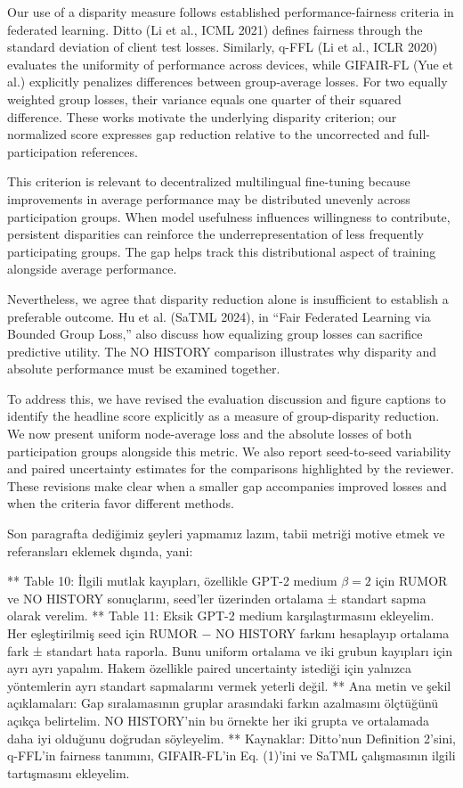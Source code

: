 Our use of a disparity measure follows established performance-fairness criteria in federated learning. Ditto (Li et al., ICML 2021) defines fairness through the standard deviation of client test losses. Similarly, q-FFL (Li et al., ICLR 2020) evaluates the uniformity of performance across devices, while GIFAIR-FL (Yue et al.) explicitly penalizes differences between group-average losses. For two equally weighted group losses, their variance equals one quarter of their squared difference. These works motivate the underlying disparity criterion; our normalized score expresses gap reduction relative to the uncorrected and full-participation references.

This criterion is relevant to decentralized multilingual fine-tuning because improvements in average performance may be distributed unevenly across participation groups. When model usefulness influences willingness to contribute, persistent disparities can reinforce the underrepresentation of less frequently participating groups. The gap helps track this distributional aspect of training alongside average performance.

Nevertheless, we agree that disparity reduction alone is insufficient to establish a preferable outcome. Hu et al. (SaTML 2024), in “Fair Federated Learning via Bounded Group Loss,” also discuss how equalizing group losses can sacrifice predictive utility. The NO HISTORY comparison illustrates why disparity and absolute performance must be examined together.

To address this, we have revised the evaluation discussion and figure captions to identify the headline score explicitly as a measure of group-disparity reduction. We now present uniform node-average loss and the absolute losses of both participation groups alongside this metric. We also report seed-to-seed variability and paired uncertainty estimates for the comparisons highlighted by the reviewer. These revisions make clear when a smaller gap accompanies improved losses and when the criteria favor different methods. 

Son paragrafta dediğimiz şeyleri yapmamız lazım, tabii metriği motive etmek ve referansları eklemek dışında, yani:

** Table 10: İlgili mutlak kayıpları, özellikle GPT-2 medium \(\beta=2\) için RUMOR ve NO HISTORY sonuçlarını, seed’ler üzerinden ortalama ± standart sapma olarak verelim.
** Table 11: Eksik GPT-2 medium karşılaştırmasını ekleyelim. Her eşleştirilmiş seed için RUMOR − NO HISTORY farkını hesaplayıp ortalama fark ± standart hata raporla. Bunu uniform ortalama ve iki grubun kayıpları için ayrı ayrı yapalım. Hakem özellikle paired uncertainty istediği için yalnızca yöntemlerin ayrı standart sapmalarını vermek yeterli değil.
** Ana metin ve şekil açıklamaları: Gap sıralamasının gruplar arasındaki farkın azalmasını ölçtüğünü açıkça belirtelim. NO HISTORY’nin bu örnekte her iki grupta ve ortalamada daha iyi olduğunu doğrudan söyleyelim.
** Kaynaklar: Ditto’nun Definition 2’sini, q-FFL’in fairness tanımını, GIFAIR-FL’in Eq. (1)’ini ve SaTML çalışmasının ilgili tartışmasını ekleyelim.

